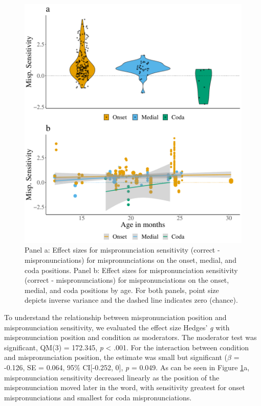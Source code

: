 \documentclass[man]{apa6}
\begin{document}
\begin{figure}
\centering
\includegraphics{VonHolzenBergmann_MPMetaAnalysis_files/figure-latex/PlotMispPosit-1.pdf}
\caption{\label{fig:PlotMispPosit}Panel a: Effect sizes for mispronunciation sensitivity (correct - mispronunciations) for mispronunciations on the onset, medial, and coda positions. Panel b: Effect sizes for mispronunciation sensitivity (correct - mispronunciations) for mispronunciations on the onset, medial, and coda positions by age. For both panels, point size depicts inverse variance and the dashed line indicates zero (chance).}
\end{figure}

To understand the relationship between mispronunciation position and mispronunciation sensitivity, we evaluated the effect size Hedges' \emph{g} with mispronunciation position and condition as moderators. The moderator test was significant, QM(3) = 172.345, \emph{p} \textless{} .001. For the interaction between condition and mispronunciation position, the estimate was small but significant (\(\beta\) = -0.126, SE = 0.064, 95\% CI{[}-0.252, 0{]}, \emph{p} = 0.049. As can be seen in Figure \ref{fig:PlotMispPosit}a, mispronunciation sensitivity decreased linearly as the position of the mispronunciation moved later in the word, with sensitivity greatest for onset mispronunciations and smallest for coda mispronunciations.
\end{document}
